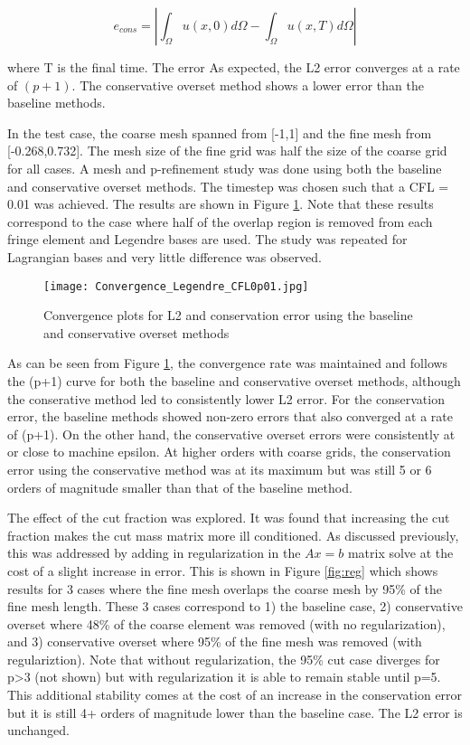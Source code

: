 \documentclass[11pt]{article}
\begin{document}
\begin{equation}
e_{cons} = \left | \int_\Omega u(x,0) d\Omega - \int_\Omega u(x,T) d\Omega \right |
\label{eq:conserror}
\end{equation}

\noindent where T is the final time.  The error 
As expected, the L2 error converges at a rate of $(p+1)$. The conservative overset method
shows a lower error than the baseline methods. 

In the test case, the coarse
mesh spanned from [-1,1] and the fine mesh from [-0.268,0.732]. The mesh size of the 
fine grid was half the size of the coarse grid for all cases. A mesh and p-refinement
study was done using both the baseline and conservative overset methods. The timestep
was chosen such that a CFL = 0.01 was achieved. The
results are shown in Figure \ref{fig:error1}. Note that 
these results correspond to the case where half of the overlap region is removed from
each fringe element and Legendre bases are used. The study was repeated for Lagrangian
bases and very little difference was observed.  


\begin{figure}
\centering
  \texttt{[image: Convergence\_Legendre\_CFL0p01.jpg]}
  \caption{Convergence plots for L2 and conservation error using the baseline and conservative overset methods}
  \label{fig:error1}
\end{figure}

As can be seen from Figure \ref{fig:error1}, the convergence rate was maintained and 
follows the (p+1) curve for both the baseline and conservative overset methods, although
the conserative method led to consistently lower L2 error. For the conservation error, 
the baseline methods showed non-zero errors that also converged at a rate of (p+1). On
the other hand, the conservative overset errors were consistently at or close to machine epsilon. 
At higher orders with coarse grids, the conservation error using the conservative method was at
its maximum but was still 5 or 6 orders of magnitude smaller than that of the baseline method. 

The effect of the cut fraction was explored. It was found that increasing the cut fraction
makes the cut mass matrix more ill conditioned. As discussed previously, this was addressed
by adding in regularization in the $Ax=b$ matrix solve at the cost of a slight increase
in error. This is shown in Figure \ref{fig:reg} which shows results for 3 cases
where the fine mesh overlaps the coarse mesh by 95\% of the fine mesh length. These 3
cases correspond to 1) the baseline case, 2) conservative overset where 48\% of the coarse element 
was removed (with no regularization), and 3) conservative overset where 95\% of the fine mesh was removed (with
regulariztion). Note that without regularization, the 95\% cut case diverges for p>3 (not shown) but with regularization it is able to 
remain stable until p=5. This additional stability comes at the cost of an increase in the conservation
error but it is still 4+ orders of magnitude lower than the baseline case. The L2 error is unchanged. 
\end{document}
